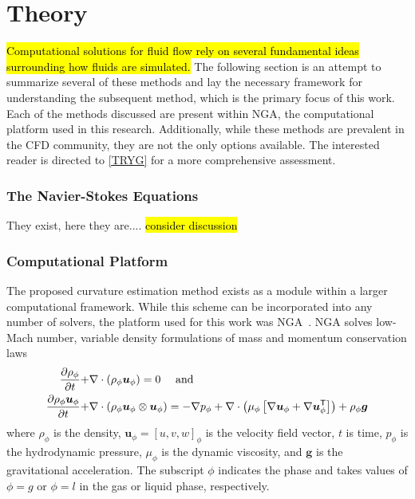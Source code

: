 \chapter{Theory} \label{CH:theory}
\hl{Computational solutions for fluid flow rely on several fundamental ideas surrounding how fluids are simulated.} The following section is an attempt to summarize several of these methods and lay the necessary framework for understanding the subsequent method, which is the primary focus of this work. Each of the methods discussed are present within NGA, the computational platform used in this research. Additionally, while these methods are prevalent in the CFD community, they are not the only options available. The interested reader is directed to \ref{TRYG} for a more comprehensive assessment.   

\subsection{The Navier-Stokes Equations}
They exist, here they are....
\hl{consider discussion}

\subsection{Computational Platform}
 The proposed curvature estimation method exists as a module within a larger computational framework. While this scheme can be incorporated into any number of solvers, the platform used for this work was NGA~\cite{NGA1,NGA2}.  NGA solves low-Mach number, variable density formulations of mass and momentum conservation laws
\begin{align}
\frac{\partial \rho_\phi}{\partial t} +& \nabla \cdot \left(\rho_\phi\mbox{\boldmath{$u$}}_\phi\right) = 0\mbox{ \quad and}\\
\frac{\partial \rho_\phi \mbox{\boldmath{$u$}}_\phi}{\partial t} +& \nabla \cdot \left(\rho_\phi\mbox{\boldmath{$u$}}_\phi\otimes\mbox{\boldmath{$u$}}_\phi\right) = -\nabla p_\phi + \nabla\cdot\left(\mu_\phi\left[\nabla\mbox{\boldmath{$u$}}_\phi+\nabla\mbox{\boldmath{$u$}}_\phi^\mathsf{T}\right]\right)+\rho_\phi\mbox{\boldmath{$g$}}
\end{align}
where
$\rho_\phi$ is the density,
$\bm{u}_\phi=[u,v,w]_\phi$ is the velocity field vector,
$t$ is time,
$p_\phi$ is the hydrodynamic pressure,
$\mu_\phi$ is the dynamic viscosity, and
$\bm{g}$ is the gravitational acceleration.
The subscript
$\phi$ indicates the phase and takes values of $\phi=g$ or
$\phi=l$ in the gas or liquid phase, respectively.

